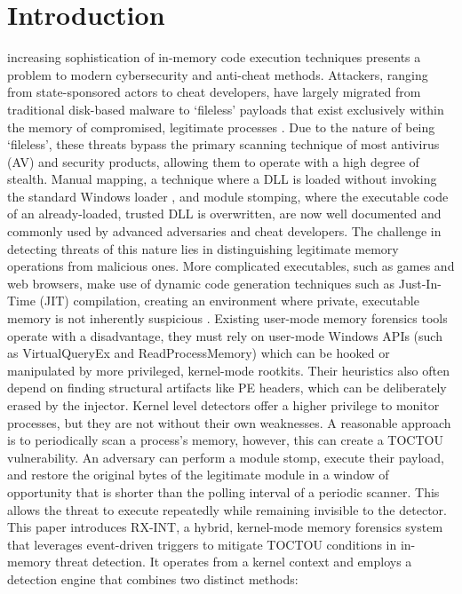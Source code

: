 \documentclass[journal]{IEEEtran}
\begin{document}
\section{Introduction}
 increasing sophistication of in-memory code execution techniques presents a problem to modern cybersecurity and anti-cheat methods. Attackers, ranging from state-sponsored actors to cheat developers, have largely migrated from traditional disk-based malware to `fileless' payloads that exist exclusively within the memory of compromised, legitimate processes \cite{crowdstrike2024gtr} \cite{mandiant2024mtrends}. Due to the nature of being `fileless', these threats bypass the primary scanning technique of most antivirus (AV) and security products, allowing them to operate with a high degree of stealth. Manual mapping, a technique where a DLL is loaded without invoking the standard Windows loader \cite{fewer2008reflective}, and module stomping, where the executable code of an already-loaded, trusted DLL is overwritten, are now well documented and commonly used by advanced adversaries and cheat developers.
The challenge in detecting threats of this nature lies in distinguishing legitimate memory operations from malicious ones. More complicated executables, such as games and web browsers, make use of dynamic code generation techniques such as Just-In-Time (JIT) compilation, creating an environment where private, executable memory is not inherently suspicious \cite{chromiumV8Jit}. Existing user-mode memory forensics tools operate with a disadvantage, they must rely on user-mode Windows APIs (such as VirtualQueryEx and ReadProcessMemory) which can be hooked or manipulated by more privileged, kernel-mode rootkits. Their heuristics also often depend on finding structural artifacts like PE headers, which can be deliberately erased by the injector.
Kernel level detectors offer a higher privilege to monitor processes, but they are not without their own weaknesses. A reasonable approach is to periodically scan a process's memory, however, this can create a TOCTOU vulnerability. An adversary can perform a module stomp, execute their payload, and restore the original bytes of the legitimate module in a window of opportunity that is shorter than the polling interval of a periodic scanner. This allows the threat to execute repeatedly while remaining invisible to the detector.
This paper introduces RX-INT, a hybrid, kernel-mode memory forensics system that leverages event-driven triggers to mitigate TOCTOU conditions in in-memory threat detection. It operates from a kernel context and employs a detection engine that combines two distinct methods:
\end{document}
